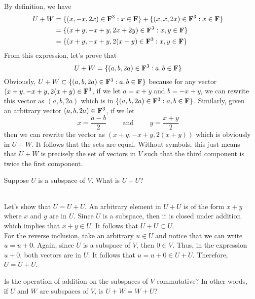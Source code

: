 \begin{solution}
    \\ By definition, we have
    \begin{align*}
        U+W &= \{(x, -x, 2x) \in \mathbf{F}^3:x \in \mathbf{F}\} + \{(x, x, 2x) \in \mathbf{F}^3:x \in \mathbf{F}\} \\
        &= \{(x+y, -x+y, 2x+2y) \in \mathbf{F}^3:x,y \in \mathbf{F}\} \\
        &= \{(x+y, -x+y, 2(x+y) \in \mathbf{F}^3:x,y \in \mathbf{F}\}
    \end{align*}
    From this expression, let's prove that
    $$U+W = \{(a, b, 2a) \in \mathbf{F}^3:a,b \in \mathbf{F}\}$$
    Obviously, $U+W \subset \{(a, b, 2a) \in \mathbf{F}^3:a,b \in \mathbf{F}\}$ because for any vector $(x+y, -x+y, 2(x+y) \in \mathbf{F}^3$, if we let $a = x+y$ and $b = -x+y$, we can rewrite this vector as $(a,b,2a)$ which is in $ \{(a, b, 2a) \in \mathbf{F}^3:a,b \in \mathbf{F}\}$. Similarly, given an arbitrary vector $(a, b, 2a) \in \mathbf{F}^3$, if we let
    $$x = \frac{a-b}{2} \qquad \text{ and } \qquad y = \frac{x+y}{2}$$
    then we can rewrite the vector as $(x+y, -x+y, 2(x+y))$ which is obviously in $U+W$. It follows that the sets are equal. Without symbols, this just means that $U+W$ is precisely the set of vectors in $V$ such that the third component is twice the first component. \\
\end{solution}

\begin{exercise}
    Suppose $U$ is a subspace of $V$. What is $U+U$? \\
\end{exercise}

\begin{solution}
    \\ Let's show that $U = U+U$. An arbitrary element in $U+U$ is of the form $x+y$ where $x$ and $y$ are in $U$. Since $U$ is a subspace, then it is closed under addition which implies that $x+y \in U$. It follows that $U+U \subset U$. \\
    For the reverse inclusion, take an arbitrary $u \in U$ and notice that we can write $u = u + 0$. Again, since $U$ is a subspace of $V$, then $0 \in V$. Thus, in the expression $u+0$, both vectors are in $U$. It follows that $u  = u+0 \in U+U$. Therefore, $U = U+U$.\\
\end{solution}

\begin{exercise}
    Is the operation of addition on the subspaces of $V$ commutative? In other words, if $U$ and $W$ are subspaces of $V$, is $U+W = W +U$? \\
\end{exercise}

